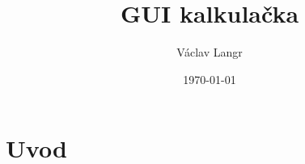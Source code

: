 


\title{GUI kalkulačka}
%
\author{Václav Langr}
\supervisor{}
% 
\date{\today} %
\newcommand{\TextTitulniStranaPodLinkou}{\tiny
Studentská 2 {\color{FM_TUL} |} 461\,17 Liberec 2 {\color{FM_TUL} |} 
{vaclav.langr@tul.cz} {\color{FM_TUL} |} 
\href{http://www.fm.tul.cz/}{www.fm.tul.cz}}
 
\section{Uvod}
\begin{frame}[plain]
\titlepage
\end{frame}
